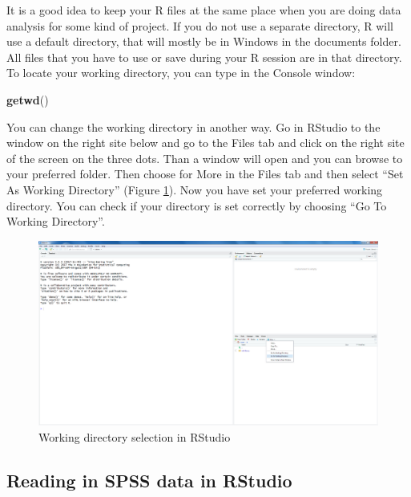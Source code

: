 \documentclass[]{book}
\newenvironment{Shaded}{\begin{snugshade}}{\end{snugshade}}
\newcommand{\KeywordTok}[1]{\textcolor[rgb]{0.13,0.29,0.53}{\textbf{#1}}}
\newcommand{\NormalTok}[1]{#1}
\begin{document}
It is a good idea to keep your R files at the same place when you are
doing data analysis for some kind of project. If you do not use a
separate directory, R will use a default directory, that will mostly be
in Windows in the documents folder. All files that you have to use or
save during your R session are in that directory. To locate your working
directory, you can type in the Console window:

\begin{Shaded}
\begin{Highlighting}[]
\KeywordTok{getwd}\NormalTok{()}
\end{Highlighting}
\end{Shaded}

You can change the working directory in another way. Go in RStudio to
the window on the right site below and go to the Files tab and click on
the right site of the screen on the three dots. Than a window will open
and you can browse to your preferred folder. Then choose for More in the
Files tab and then select ``Set As Working Directory'' (Figure
\ref{fig:fig12}). Now you have set your preferred working directory. You
can check if your directory is set correctly by choosing ``Go To Working
Directory''.

\begin{figure}

{\centering \includegraphics[width=0.95\linewidth]{images/fig1.12} 

}

\caption{Working directory selection in RStudio}\label{fig:fig12}
\end{figure}

\subsection{Reading in SPSS data in
RStudio}\label{reading-in-spss-data-in-rstudio}
\end{document}
